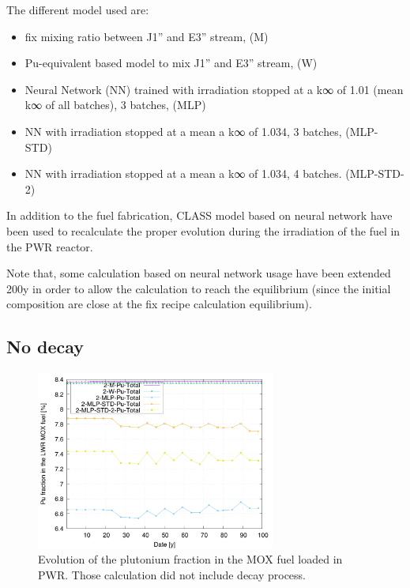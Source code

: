 \documentclass[12pt]{article}
\begin{document}
The different model used are:
\begin{itemize}
  \item fix mixing ratio between J1'' and E3'' stream, (M)
  \item	Pu-equivalent based model to mix J1'' and E3'' stream, (W)
  \item	Neural Network (NN) trained with irradiation stopped at a k∞ of 1.01 (mean k∞ of all batches), 3 batches, (MLP)
  \item	NN with irradiation stopped at a mean a k∞ of 1.034, 3 batches, (MLP-STD)
  \item	NN with irradiation stopped at a mean a k∞ of 1.034, 4 batches. (MLP-STD-2)
\end{itemize}

In addition to the fuel fabrication, CLASS model based on neural network have
been used to recalculate the proper evolution during the irradiation of the fuel
in the PWR reactor.

Note that, some calculation based on neural network usage have been extended 200y
in order to allow the calculation to reach the equilibrium (since the initial
composition are close at the fix recipe calculation equilibrium).

\subsection{No decay}

\begin{figure}[h!]
  \centering
  \includegraphics[width=0.7\textwidth]  {img/C_1_2_MOX_pu_contribution}
  \caption{Evolution of the plutonium fraction in the MOX fuel loaded in PWR.
  Those calculation did not include decay process.}
  \label{fig:pufrac_ND}
\end{figure}
%  
%  
\end{document}
